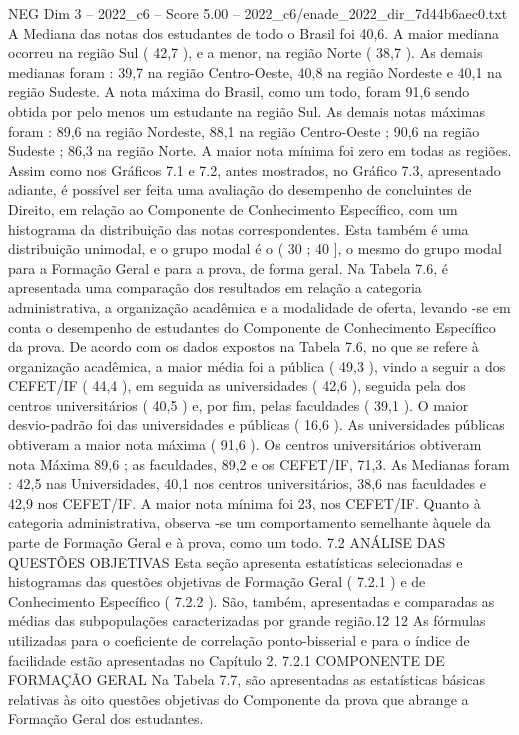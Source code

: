 \begin{textsample}{NEG Dim 3 – 2022\_c6 – Score 5.00 – 2022\_c6/enade\_2022\_dir\_7d44b6aec0.txt}
A Mediana das notas dos estudantes de todo o Brasil foi 40,6.
A maior mediana ocorreu na região Sul ( 42,7 ), e a menor, na região Norte ( 38,7 ).
As demais medianas foram : 39,7 na região Centro-Oeste, 40,8 na região Nordeste e 40,1 na região Sudeste.
A nota máxima do Brasil, como um todo, foram 91,6 sendo obtida por pelo menos um estudante na região Sul.
As demais notas máximas foram : 89,6 na região Nordeste, 88,1 na região Centro-Oeste ; 90,6 na região Sudeste ; 86,3 na região Norte.
A maior nota mínima foi zero em todas as regiões.
Assim como nos Gráficos 7.1 e 7.2, antes mostrados, no Gráfico 7.3, apresentado adiante, é possível ser feita uma avaliação do desempenho de concluintes de Direito, em relação ao Componente de Conhecimento Específico, com um histograma da distribuição das notas correspondentes.
Esta também é uma distribuição unimodal, e o grupo modal é o ( 30 ; 40 ], o mesmo do grupo modal para a Formação Geral e para a prova, de forma geral.
Na Tabela 7.6, é apresentada uma comparação dos resultados em relação a categoria administrativa, a organização acadêmica e a modalidade de oferta, levando -se em conta o desempenho de estudantes do Componente de Conhecimento Específico da prova.
De acordo com os dados expostos na Tabela 7.6, no que se refere à organização acadêmica, a maior média foi a pública ( 49,3 ), vindo a seguir a dos CEFET/IF ( 44,4 ), em seguida as universidades ( 42,6 ), seguida pela dos centros universitários ( 40,5 ) e, por fim, pelas faculdades ( 39,1 ).
O maior desvio-padrão foi das universidades e públicas ( 16,6 ).
As universidades públicas obtiveram a maior nota máxima ( 91,6 ).
Os centros universitários obtiveram nota Máxima 89,6 ; as faculdades, 89,2 e os CEFET/IF, 71,3.
As Medianas foram : 42,5 nas Universidades, 40,1 nos centros universitários, 38,6 nas faculdades e 42,9 nos CEFET/IF.
A maior nota mínima foi 23, nos CEFET/IF.
Quanto à categoria administrativa, observa -se um comportamento semelhante àquele da parte de Formação Geral e à prova, como um todo. 7.2 ANÁLISE DAS QUESTÕES OBJETIVAS Esta seção apresenta estatísticas selecionadas e histogramas das questões objetivas de Formação Geral ( 7.2.1 ) e de Conhecimento Específico ( 7.2.2 ).
São, também, apresentadas e comparadas as médias das subpopulações caracterizadas por grande região.12 12 As fórmulas utilizadas para o coeficiente de correlação ponto-bisserial e para o índice de facilidade estão apresentadas no Capítulo 2. 7.2.1 COMPONENTE DE FORMAÇÃO GERAL Na Tabela 7.7, são apresentadas as estatísticas básicas relativas às oito questões objetivas do Componente da prova que abrange a Formação Geral dos estudantes.

\end{textsample}
